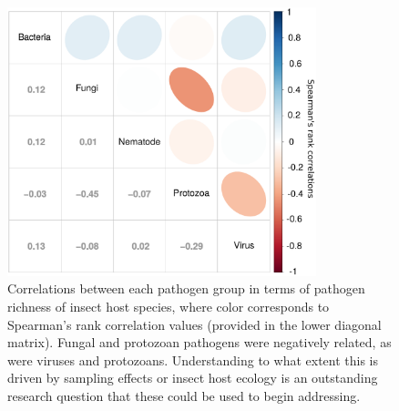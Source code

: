 \documentclass[12pt]{article}
\begin{document}
\begin{figure}[h!]
  \begin{center}
    \includegraphics[width=0.8\textwidth]{Figures/corPlot.pdf}
    \caption{Correlations between each pathogen group in terms of pathogen richness of insect host species, where color corresponds to Spearman's rank correlation values (provided in the lower diagonal matrix). Fungal and protozoan pathogens were negatively related, as were viruses and protozoans. Understanding to what extent this is driven by sampling effects or insect host ecology is an outstanding research question that these could be used to begin addressing.}
    \label{fig:corPlot}
  \end{center}
\end{figure}
\end{document}
